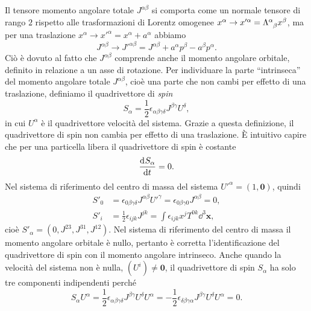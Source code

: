 Il tensore momento angolare totale $J^{\alpha\beta}$ si comporta come un normale
tensore di rango $2$ rispetto alle trasformazioni di Lorentz omogenee
$x^{\alpha} \to x'^{\alpha} = \tensor{\Lambda}{^{\alpha}_{\beta}} x^{\beta}$, ma
per una traslazione $x^{\alpha} \to x'^{\alpha} = x^{\alpha} + a^{\alpha}$
abbiamo
\begin{equation}
  J^{\alpha\beta} \to J'^{\alpha\beta} = J^{\alpha\beta} + a^{\alpha}p^{\beta} -
  a^{\beta}p^{\alpha}.
\end{equation}
Ciò è dovuto al fatto che $J^{\alpha\beta}$ comprende anche il momento angolare
orbitale, definito in relazione a un asse di rotazione.  Per individuare la
parte ``intrinseca'' del momento angolare totale $J^{\alpha\beta}$, cioè una
parte che non cambi per effetto di una traslazione, definiamo il quadrivettore
di \emph{spin}
\begin{equation}
  S_{\alpha} = \frac{1}{2}\epsilon_{\alpha\beta\gamma\delta} J^{\beta\gamma} U^{\delta},
\end{equation}
in cui $U^{\alpha}$ è il quadrivettore velocità del sistema.  Grazie a questa
definizione, il quadrivettore di spin non cambia per effetto di una traslazione.
È intuitivo capire che per una particella libera il quadrivettore di spin è
costante
\begin{equation}
  \frac{{\mathop{}\!\mathrm{d}^{}}S_{\alpha}}{\mathop{}\!\mathrm{d} {t}^{}} = 0.
\end{equation}
Nel sistema di riferimento del centro di massa del sistema
$U'^{\alpha} = (1, \bm{0})$, quindi
\begin{subequations}
  \begin{align}
    S'_{0} &= \epsilon_{0\beta\gamma\delta} J^{\alpha\beta} U'^{\gamma} =
    \epsilon_{0\beta\gamma 0} J^{\alpha\beta} = 0, \\
    S'_{i} &= \frac{1}{2}\epsilon_{ijk} J^{jk} = \int \epsilon_{ijk} x^{j}T^{0k}
    \dd^{3} \bm{x},
  \end{align}
\end{subequations}
cioè $S'_{\alpha} = (0, J^{23}, J^{31}, J^{12})$.  Nel sistema di riferimento
del centro di massa il momento angolare orbitale è nullo, pertanto è corretta
l'identificazione del quadrivettore di spin con il momento angolare intrinseco.
Anche quando la velocità del sistema non è nulla, $(U^{i}) \neq \bm{0}$, il
quadrivettore di spin $S_{\alpha}$ ha solo tre componenti indipendenti perché
\begin{equation}
  S_{\alpha}U^{\alpha} = \frac{1}{2}
  \epsilon_{\alpha\beta\gamma\delta}J^{\beta\gamma}U^{\delta}U^{\alpha} =
  -\frac{1}{2}
  \epsilon_{\delta\beta\gamma\alpha}J^{\beta\gamma}U^{\delta}U^{\alpha} = 0.
\end{equation}


